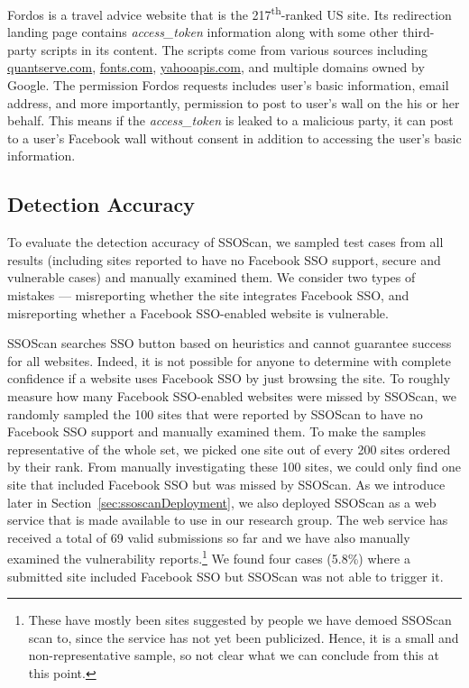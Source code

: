  Fordos is a travel advice website that is the 217\textsuperscript{th}-ranked US site.  Its redirection landing page contains \emph{access\_token} information along with some other third-party scripts in its content.  The scripts come from various sources including \url{quantserve.com}, \url{fonts.com}, \url{yahooapis.com}, and multiple domains owned by Google.  The permission Fordos requests includes user's basic information, email address, and more importantly, permission to post to user's wall on the his or her behalf. This means if the \emph{access\_token} is leaked to a malicious party, it can post to a user's Facebook wall without consent in addition to accessing the user's basic information. 


\subsection{Detection Accuracy}
\label{sec:toolEffectiveness}
To evaluate the detection accuracy of SSOScan, we sampled test cases from all results (including sites reported to have no Facebook SSO support, secure and vulnerable cases) and manually examined them.  We consider two types of mistakes --- misreporting whether the site integrates Facebook SSO, and misreporting whether a Facebook SSO-enabled website is vulnerable.  

 SSOScan searches SSO button based on heuristics and cannot guarantee success for all websites. Indeed, it is not possible for anyone to determine with complete confidence if a website uses Facebook SSO by just browsing the site.  To roughly measure how many Facebook SSO-enabled websites were missed by SSOScan, we randomly sampled the 100 sites that were reported by SSOScan to have no Facebook SSO support and manually examined them.  To make the samples representative of the whole set, we picked one site out of every 200 sites ordered by their rank.  From manually investigating these 100 sites, we could only find one site that included Facebook SSO but was missed by SSOScan.  As we introduce later in Section~\ref{sec:ssoscanDeployment}, we also deployed SSOScan as a web service that is made available to use in our research group.  The web service has received a total of 69 valid submissions so far and we have also manually examined the vulnerability reports.\footnote{These have mostly been sites suggested by people we have demoed SSOScan scan to, since the service has not yet been publicized.  Hence, it is a small and non-representative sample, so not clear what we can conclude from this at this point.}  We found four cases (5.8\%) where a submitted site included Facebook SSO but SSOScan was not able to trigger it.

